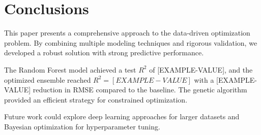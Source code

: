 \section{Conclusions}

This paper presents a comprehensive approach to the data-driven optimization problem.
By combining multiple modeling techniques and rigorous validation, we developed a robust
solution with strong predictive performance.

The Random Forest model achieved a test $R^2$ of [EXAMPLE-VALUE], and the optimized ensemble
reached $R^2 = [EXAMPLE-VALUE]$ with a [EXAMPLE-VALUE] reduction in RMSE compared to the baseline.
The genetic algorithm provided an efficient strategy for constrained optimization.

Future work could explore deep learning approaches for larger datasets and
Bayesian optimization for hyperparameter tuning.
